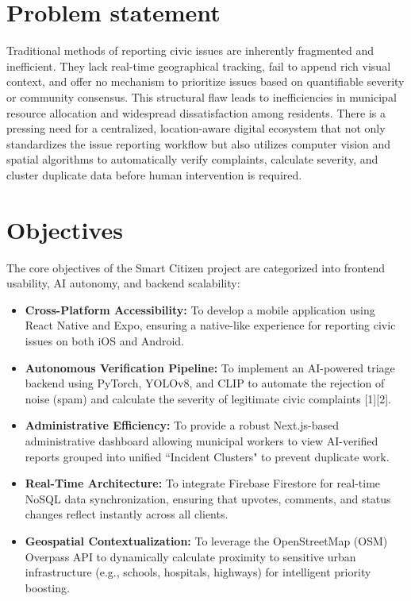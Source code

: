 \documentclass[12pt,a4paper]{report}
\begin{document}
\section{Problem statement}
Traditional methods of reporting civic issues are inherently fragmented and inefficient. They lack real-time geographical tracking, fail to append rich visual context, and offer no mechanism to prioritize issues based on quantifiable severity or community consensus. This structural flaw leads to inefficiencies in municipal resource allocation and widespread dissatisfaction among residents. There is a pressing need for a centralized, location-aware digital ecosystem that not only standardizes the issue reporting workflow but also utilizes computer vision and spatial algorithms to automatically verify complaints, calculate severity, and cluster duplicate data before human intervention is required.

\section{Objectives}
The core objectives of the Smart Citizen project are categorized into frontend usability, AI autonomy, and backend scalability:
\begin{itemize}
    \item \textbf{Cross-Platform Accessibility:} To develop a mobile application using React Native and Expo, ensuring a native-like experience for reporting civic issues on both iOS and Android.
    \item \textbf{Autonomous Verification Pipeline:} To implement an AI-powered triage backend using PyTorch, YOLOv8, and CLIP to automate the rejection of noise (spam) and calculate the severity of legitimate civic complaints [1][2].
    \item \textbf{Administrative Efficiency:} To provide a robust Next.js-based administrative dashboard allowing municipal workers to view AI-verified reports grouped into unified ``Incident Clusters" to prevent duplicate work.
    \item \textbf{Real-Time Architecture:} To integrate Firebase Firestore for real-time NoSQL data synchronization, ensuring that upvotes, comments, and status changes reflect instantly across all clients.
    \item \textbf{Geospatial Contextualization:} To leverage the OpenStreetMap (OSM) Overpass API to dynamically calculate proximity to sensitive urban infrastructure (e.g., schools, hospitals, highways) for intelligent priority boosting.
\end{itemize}
\end{document}
